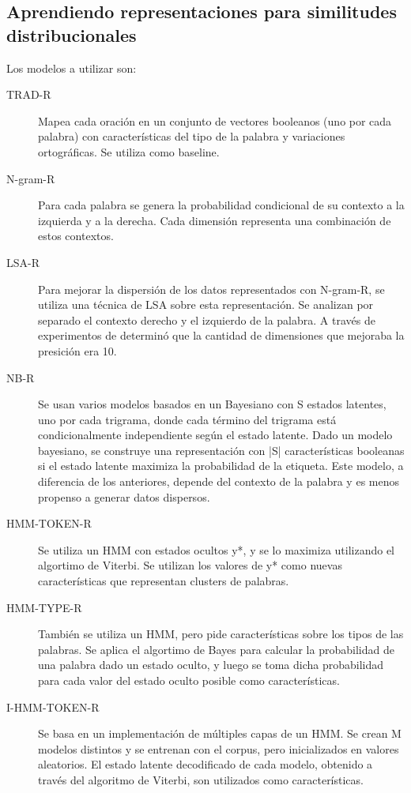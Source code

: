 \documentclass[11pt,spanish]{article}
\begin{document}
\subsection{Aprendiendo representaciones para similitudes distribucionales}
Los modelos a utilizar son:
\begin{description}
    \item[TRAD-R] Mapea cada oración en un conjunto de vectores booleanos (uno por cada palabra) con características del tipo de la palabra y variaciones ortográficas. Se utiliza como baseline.
    \item[N-gram-R] Para cada palabra se genera la probabilidad condicional de su contexto a la izquierda y a la derecha. Cada dimensión representa una combinación de estos contextos.
    \item[LSA-R] Para mejorar la dispersión de los datos representados con N-gram-R, se utiliza una técnica de LSA sobre esta representación. Se analizan por separado el contexto derecho y el izquierdo de la palabra. A través de experimentos de determinó que la cantidad de dimensiones que mejoraba la presición era 10.
    \item[NB-R] Se usan varios modelos basados en un Bayesiano con S estados latentes, uno por cada trigrama, donde cada término del trigrama está condicionalmente independiente según el estado latente. Dado un modelo bayesiano, se construye una representación con |S| características booleanas si el estado latente maximiza la probabilidad de la etiqueta. Este modelo, a diferencia de los anteriores, depende del contexto de la palabra y es menos propenso a generar datos dispersos.
    \item[HMM-TOKEN-R] Se utiliza un HMM con estados ocultos y*, y se lo maximiza utilizando el algortimo de Viterbi. Se utilizan los valores de y* como nuevas características que representan clusters de palabras.
    \item[HMM-TYPE-R] También se utiliza un HMM, pero pide características sobre los tipos de las palabras. Se aplica el algortimo de Bayes para calcular la probabilidad de una palabra dado un estado oculto, y luego se toma dicha probabilidad para cada valor del estado oculto posible como características.
    \item[I-HMM-TOKEN-R] Se basa en un implementación de múltiples capas de un HMM. Se crean M modelos distintos y se entrenan con el corpus, pero inicializados en valores aleatorios. El estado latente decodificado de cada modelo, obtenido a través del algoritmo de Viterbi, son utilizados como características.

\end{description}
\end{document}
